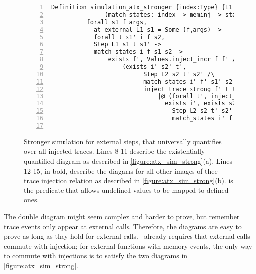 \begin{figure}\label{fig:simulation_atxX}
\begin{lstlisting}[numbers=left] 
Definition simulation_atx_stronger {index:Type} {L1 L2: semantics}
               (match_states: index -> meminj -> state L1 -> state L2 -> Prop) :=
          forall s1 f args,
            at_external L1 s1 = Some (f,args) -> 
            forall t s1' i f s2, 
            Step L1 s1 t s1' ->
            match_states i f s1 s2 ->
             	exists f', Values.inject_incr f f' /\
                 	(exists i' s2' t',
                          Step L2 s2 t' s2' /\
                          match_states i' f' s1' s2' /\
                          inject_trace_strong f' t t')  /\
                              |@ (forall t', inject_trace f' t t' -> 
                              	exists i', exists s2',
                                  Step L2 s2 t' s2' /\
                                  match_states i' f' s1' s2') @|.


\end{lstlisting}


\caption[Strong simulation for external steps]{Stronger simulation for external steps, that universally quantifies over all injected traces. Lines 8-11 describe the existentially quantified diagram as described in \cref{figure:atx_sim_strong}(a). Lines 12-15, in bold, describe the diagams for all other images of thee trace injection relation as described in \cref{figure:atx_sim_strong}(b).  is the predicate that allows undefined values to be mapped to defined ones. }\label{code:full_atx_sim}
\end{figure}

The double diagram might seem complex and harder to prove, but remember trace events only appear at external calls. Therefore, the diagrams are easy to prove as long as they hold for external calls. \compcert\ already requires that external calls commute with injection; for external functions with memory events, the only way to commute with injections is to satisfy the two diagrams in \cref{figure:atx_sim_strong}.

